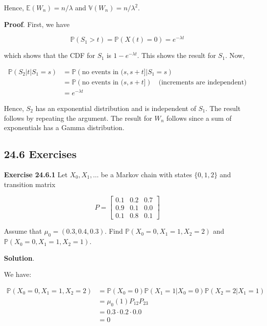 Hence, \(\mathbb{E}(W_{n}) = n / \lambda\) and
\(\mathbb{V}(W_{n}) = n / \lambda^{2}\).

\textbf{Proof}. First, we have

\[ \mathbb{P}(S_{1} > t) = \mathbb{P}(X(t) = 0) = e^{-\lambda t}\]

which shows that the CDF for \(S_{1}\) is \(1 - e^{-\lambda t}\). This
shows the result for \(S_{1}\). Now,

\begin{align*}
\mathbb{P}(S_{2} | t | S_{1} = s) &= \mathbb{P}\left(\text{no events in } (s, s+t] | S_{1} = s\right) \\
&= \mathbb{P}\left(\text{no events in } (s, s+t]\right) \quad \text{(increments are independent)} \\
&= e^{-\lambda t}
\end{align*}

Hence, \(S_{2}\) has an exponential distribution and is independent of
\(S_{1}\). The result follows by repeating the argument. The result for
\(W_{n}\) follows since a sum of exponentials has a Gamma distribution.

\subsection*{24.6 Exercises}

\textbf{Exercise 24.6.1} Let \(X_{0}, X_{1}, \dots\) be a Markov chain with
states \(\{ 0, 1, 2 \}\) and transition matrix

\[ P = \begin{bmatrix}
0.1 & 0.2 & 0.7 \\
0.9 & 0.1 & 0.0 \\
0.1 & 0.8 & 0.1
\end{bmatrix}\]

Assume that \(\mu_{0} = (0.3, 0.4, 0.3)\). Find
\(\mathbb{P}(X_{0} = 0, X_{1} = 1, X_{2} = 2)\) and
\(\mathbb{P}(X_{0} = 0, X_{1} = 1, X_{2} = 1)\).

\textbf{Solution}.

We have:

\begin{align*}
\mathbb{P}(X_{0} = 0, X_{1} = 1, X_{2} = 2) &= \mathbb{P}(X_{0} = 0) \mathbb{P}(X_{1} = 1 | X_{0} = 0) \mathbb{P}(X_{2} = 2 | X_{1} = 1) \\
&= \mu_{0}(1) P_{12} P_{23} \\
& = 0.3 \cdot 0.2 \cdot 0.0 \\
& = 0
\end{align*}

